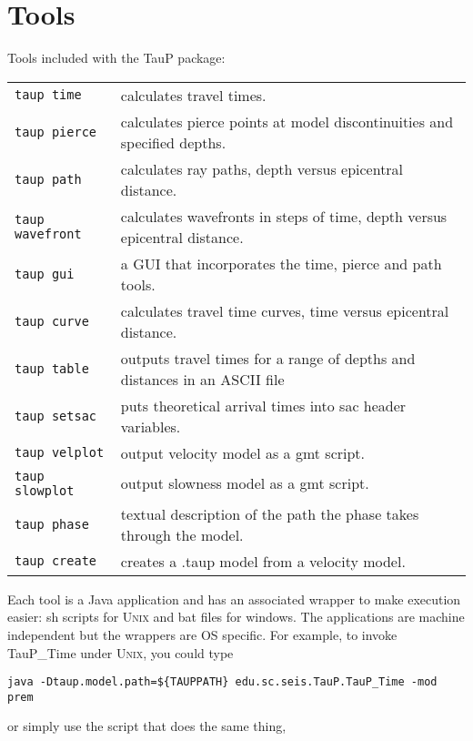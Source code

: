 
\section{Tools}

Tools included with the TauP package:

\begin{center}
\begin{tabular}{lp{3.2in}}

\texttt{taup time} &
  calculates travel times. \\
\texttt{taup pierce} &
  calculates pierce points at model discontinuities and specified depths. \\
\texttt{taup path} & calculates ray paths, depth versus epicentral distance. \\
\texttt{taup wavefront} & calculates wavefronts in steps of time, depth versus epicentral distance. \\
\texttt{taup gui} & a GUI that incorporates the time, pierce and path tools. \\
\texttt{taup curve} &
  calculates travel time curves, time versus epicentral distance. \\
\texttt{taup table} & outputs travel times for a range of depths and distances in an ASCII file \\
\texttt{taup setsac} &
  puts theoretical arrival times into sac header variables. \\
\texttt{taup velplot} &
  output velocity model as a gmt script. \\
\texttt{taup slowplot} &
  output slowness model as a gmt script. \\
\texttt{taup phase} &
textual description of the path the phase takes through the model. \\
\texttt{taup create} &
  creates a .taup model from a velocity model. \\
\end{tabular}
\end{center}

Each tool is a Java application and has an associated wrapper to make
execution easier: sh scripts
for \textsc{Unix} and
bat files for windows.  The applications are machine independent but the
wrappers are OS specific.
For example, to invoke TauP\_Time under \textsc{Unix}, you could type

\texttt{java -Dtaup.model.path=\$\{TAUPPATH\} edu.sc.seis.TauP.TauP\_Time -mod prem}

or simply use the script that does the same thing,

